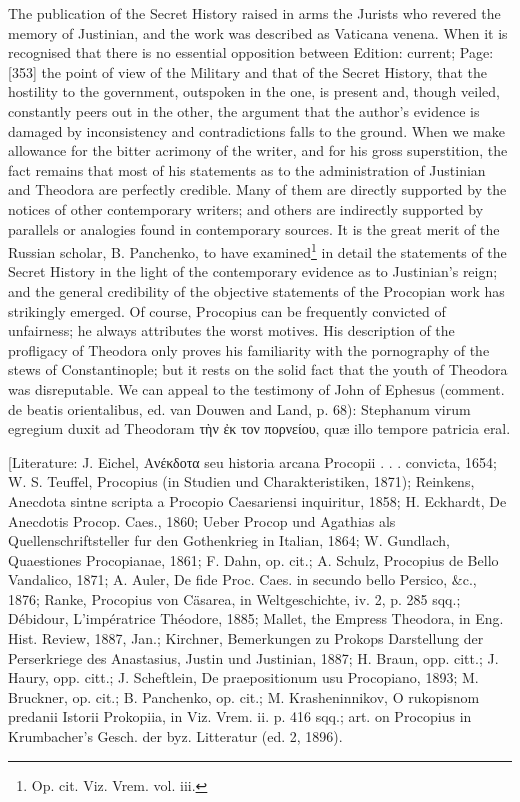The publication of the Secret History raised in arms the Jurists who revered the memory of Justinian, and the work was described as Vaticana venena. When it is recognised that there is no essential opposition between Edition: current; Page: [353] the point of view of the Military and that of the Secret History, that the hostility to the government, outspoken in the one, is present and, though veiled, constantly peers out in the other, the argument that the author\texthebrew{}’s evidence is damaged by inconsistency and contradictions falls to the ground. When we make allowance for the bitter acrimony of the writer, and for his gross superstition, the fact remains that most of his statements as to the administration of Justinian and Theodora are perfectly credible. Many of them are directly supported by the notices of other contemporary writers; and others are indirectly supported by parallels or analogies found in contemporary sources. It is the great merit of the Russian scholar, B. Panchenko, to have examined\footnote{Op. cit. Viz. Vrem. vol. iii.} in detail the statements of the Secret History in the light of the contemporary evidence as to Justinian\texthebrew{}’s reign; and the general credibility of the objective statements of the Procopian work has strikingly emerged. Of course, Procopius can be frequently convicted of unfairness; he always attributes the worst motives. His description of the profligacy of Theodora only proves his familiarity with the pornography of the stews of Constantinople; but it rests on the solid fact that the youth of Theodora was disreputable. We can appeal to the testimony of John of Ephesus (comment. de beatis orientalibus, ed. van Douwen and Land, p. 68): Stephanum virum egregium duxit ad Theodoram \textgreek{τ\texthebrew{ὴ}ν \texthebrew{ἐ}κ τον πορνείου}, quæ illo tempore patricia eral.

[Literature: J. Eichel, \textgreek{Ανέκδοτα} seu historia arcana Procopii . . . convicta, 1654; W. S. Teuffel, Procopius (in Studien und Charakteristiken, 1871); Reinkens, Anecdota sintne scripta a Procopio Caesariensi inquiritur, 1858; H. Eckhardt, De Anecdotis Procop. Caes., 1860; Ueber Procop und Agathias als Quellenschriftsteller fur den Gothenkrieg in Italian, 1864; W. Gundlach, Quaestiones Procopianae, 1861; F. Dahn, op. cit.; A. Schulz, Procopius de Bello Vandalico, 1871; A. Auler, De fide Proc. Caes. in secundo bello Persico, \&c., 1876; Ranke, Procopius von Cäsarea, in Weltgeschichte, iv. 2, p. 285 sqq.; Débidour, L\texthebrew{}’impératrice Théodore, 1885; Mallet, the Empress Theodora, in Eng. Hist. Review, 1887, Jan.; Kirchner, Bemerkungen zu Prokops Darstellung der Perserkriege des Anastasius, Justin und Justinian, 1887; H. Braun, opp. citt.; J. Haury, opp. citt.; J. Scheftlein, De praepositionum usu Procopiano, 1893; M. Bruckner, op. cit.; B. Panchenko, op. cit.; M. Krasheninnikov, O rukopisnom predanii Istorii Prokopiia, in Viz. Vrem. ii. p. 416 sqq.; art. on Procopius in Krumbacher\texthebrew{}’s Gesch. der byz. Litteratur (ed. 2, 1896).

